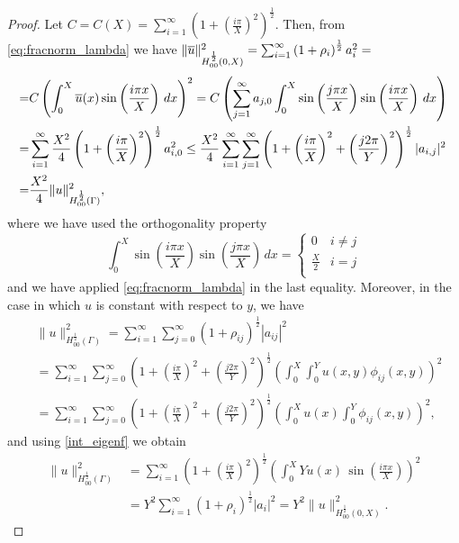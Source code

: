 \begin{proof}
Let $C=C(X)=\sum_{i=1}^{\infty}\left( 1+ \left(\frac{i\pi}{X}\right)^2\right)^{\frac 12}$. Then,  
from \eqref{eq:fracnorm_lambda} we have $\|\overline{u}\|^2_{H^{\frac 12}_{00}(0,X)}
=\sum_{i=1}^{\infty} \left( 1+ \rho_{i}\right)^{\frac 12}a_i^2=$
\begin{equation*}
\begin{split}
=&C\left( \int_0^X \overline{u}(x) \sin\left(\frac{i\pi x}{X}\right)\, dx \right)^2
= C\left( \sum_{j=1}^\infty a_{j,0}\int_0^X \sin\left(\frac{j\pi x}{X}\right) \sin\left(\frac{i\pi x}{X}\right) \, dx  \right)\\
=& \sum_{i=1}^{\infty} \frac{X^2}{4} \left( 1+ \left(\frac{i\pi}{X}\right)^2\right)^{\frac 12}a_{i,0}^2
\leq \frac{X^2}{4}\sum_{i=1}^{\infty} \sum_{j=1}^{\infty}  \left( 1+ \left(\frac{i\pi}{X}\right)^2 
+ \left(\frac{j2\pi}{Y}\right)^2\right)^{\frac 12} |a_{i,j}|^2\\ =&\frac{X^2}{4}\|u\|^2_{H^{\frac 12}_{00}(\Gamma)},
\end{split}
\end{equation*}
where we have used the orthogonality property
\begin{equation*}
\int_0^X \sin\left(\frac{i\pi x}{X}\right) \sin\left(\frac{j\pi x}{X}\right)\, dx=\begin{cases} 0 & i\neq j\\
\frac X 2 & i = j\\
\end{cases}
\end{equation*}
and we have applied \eqref{eq:fracnorm_lambda} in the last equality.
Moreover, in the case in which $u$ is constant with respect to $y$, we have
\begin{equation*}
    \begin{aligned}
&\|u\|^2_{H^{\frac 12}_{00}(\Gamma)}=\sum_{i=1}^{\infty}\sum_{j=0}^{\infty} \left( 1+ \rho_{ij}\right)^{\frac 12}|a_{ij}|^2\\
&=\sum_{i=1}^{\infty}\sum_{j=0}^{\infty} \left(  1+ \left(\frac{i\pi}{X}\right)^2 + \left(\frac{j2\pi}{Y}\right)^2\right)^{\frac 12}\left( \int _0^X\int _0^Y u(x,y )\phi_{ij}(x,y) \right)^2
\\
&=\sum_{i=1}^{\infty}\sum_{j=0}^{\infty} \left(  1+ \left(\frac{i\pi}{X}\right)^2 + \left(\frac{j2\pi}{Y}\right)^2\right)^{\frac 12}\left( \int _0^X u(x) \int _0^Y \phi_{ij}(x,y) \right)^2,
\end{aligned}
\end{equation*}
and using \eqref{int_eigenf} we obtain
\begin{equation*}
\begin{aligned}
\|u\|^2_{H^{\frac 12}_{00}(\Gamma)}
&=\sum_{i=1}^{\infty}\left( 1+ \left(\frac{i\pi}{X}\right)^2\right)^{\frac 12}\left(\int _0^X Yu(x)\, \sin\left(\frac{i\pi x}{X}\right)\right)^2\\
&=Y^2 \sum_{i=1}^{\infty}\left( 1+ \rho _i\right)^{\frac 12}|a_i|^2 = Y^2  \|u\|^2_{H^{\frac 12}_{00}(0,X)}.
\end{aligned}
\end{equation*}
\end{proof}

